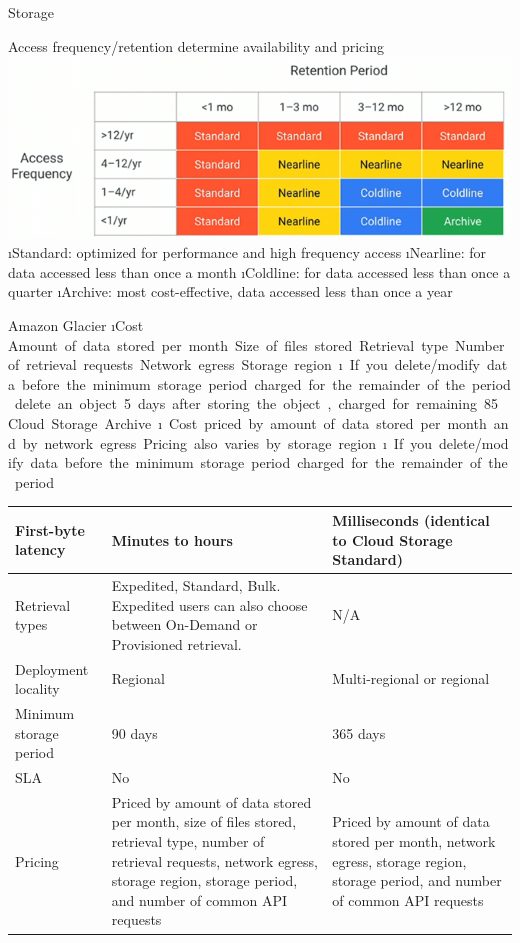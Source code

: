 \begin{frame}[allowframebreaks]{Storage}
\framebreak

Access frequency/retention determine availability and pricing
\includegraphics[width=.6\linewidth]{imgs/gc_accessfrequency.png}
\i Standard: optimized for performance and high frequency access
\i Nearline: for data accessed less than once a month
\i Coldline: for data accessed less than once a quarter
\i Archive: most cost-effective, data accessed less than once a year

\framebreak
Amazon Glacier
\i Cost
\si Amount of data stored per month
\si Size of files stored
\si Retrieval type
\si Number of retrieval requests
\si Network egress
\si Storage region
\i If you delete/modify data before the minimum storage period
\si charged for the remainder of the period
\si delete an object 5 days after storing the object, charged for remaining 85

\framebreak
Cloud Storage Archive
\i Cost
\si priced by amount of data stored per month and by network egress
\si Pricing also varies by storage region
\i If you delete/modify data before the minimum storage period
\si charged for the remainder of the period

\begin{table}
  \centering
  \footnotesize
    \begin{tabular}{lp{5cm}p{5cm}}
    \textbf{First-byte latency} & \textbf{Minutes to hours} & \textbf{Milliseconds (identical to Cloud Storage Standard)} \\
    \midrule
    Retrieval types & Expedited, Standard, Bulk. Expedited users can also choose between On-Demand or Provisioned retrieval. & N/A \\
    Deployment locality & Regional & Multi-regional or regional \\
    Minimum storage period & 90 days & 365 days \\
    SLA   & No    & No \\
    Pricing & Priced by amount of data stored per month, size of files stored, retrieval type, number of retrieval requests, network egress, storage region, storage period, and number of common API requests & Priced by amount of data stored per month, network egress, storage region, storage period, and number of common API requests \\
    \end{tabular}%
\end{table}%


\end{frame}
